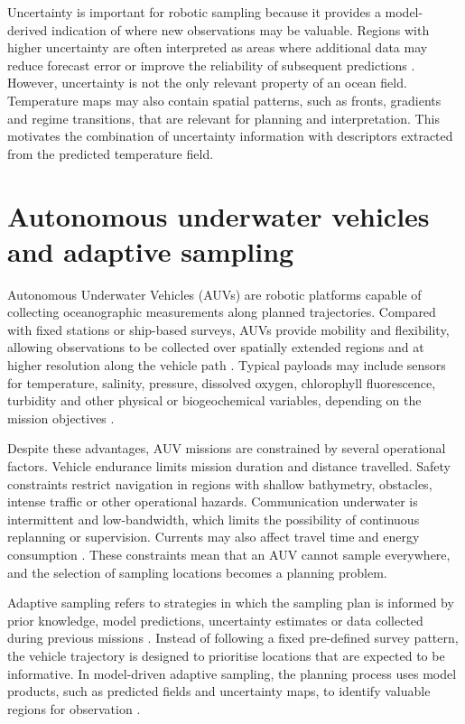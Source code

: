 Uncertainty is important for robotic sampling because it provides a model-derived indication of where new observations may be valuable. Regions with higher uncertainty are often interpreted as areas where additional data may reduce forecast error or improve the reliability of subsequent predictions \cite{bernacchi2025closingloop,duarte2025geostatistical}. However, uncertainty is not the only relevant property of an ocean field. Temperature maps may also contain spatial patterns, such as fronts, gradients and regime transitions, that are relevant for planning and interpretation. This motivates the combination of uncertainty information with descriptors extracted from the predicted temperature field.

\section{Autonomous underwater vehicles and adaptive sampling} \label{sec:auv_adaptive_sampling}

Autonomous Underwater Vehicles (AUVs) are robotic platforms capable of collecting oceanographic measurements along planned trajectories. Compared with fixed stations or ship-based surveys, AUVs provide mobility and flexibility, allowing observations to be collected over spatially extended regions and at higher resolution along the vehicle path \cite{curtin2009aosn,hwang2019auvreview}. Typical payloads may include sensors for temperature, salinity, pressure, dissolved oxygen, chlorophyll fluorescence, turbidity and other physical or biogeochemical variables, depending on the mission objectives \cite{sousa2012lauv}.

Despite these advantages, AUV missions are constrained by several operational factors. Vehicle endurance limits mission duration and distance travelled. Safety constraints restrict navigation in regions with shallow bathymetry, obstacles, intense traffic or other operational hazards. Communication underwater is intermittent and low-bandwidth, which limits the possibility of continuous replanning or supervision. Currents may also affect travel time and energy consumption \cite{aguiar2018trajectoryopt}. These constraints mean that an AUV cannot sample everywhere, and the selection of sampling locations becomes a planning problem.

Adaptive sampling refers to strategies in which the sampling plan is informed by prior knowledge, model predictions, uncertainty estimates or data collected during previous missions \cite{lermusiaux2007adaptive,hwang2019auvreview,fossum2018informationdriven}. Instead of following a fixed pre-defined survey pattern, the vehicle trajectory is designed to prioritise locations that are expected to be informative. In model-driven adaptive sampling, the planning process uses model products, such as predicted fields and uncertainty maps, to identify valuable regions for observation \cite{mendes2025oceanmodeldriven,berget2023dynamicstochastic}.

